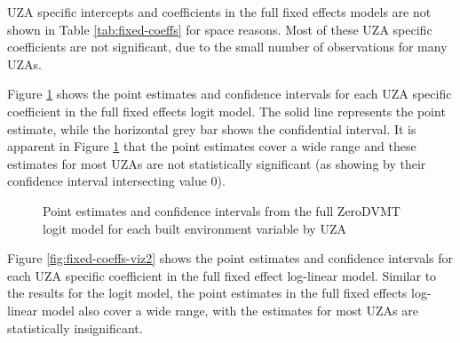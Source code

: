 \documentclass[numbered]{trbunofficial}
\begin{document}
UZA specific intercepts and coefficients in the full fixed effects models are not shown in Table \ref{tab:fixed-coeffs} for space reasons. Most of these UZA specific coefficients are not significant, due to the small number of observations for many UZAs.

Figure \ref{fig:fixed-coeffs-viz1} shows the point estimates and confidence intervals for each UZA specific coefficient in the full fixed effects logit model. The solid line represents the point estimate, while the horizontal grey bar shows the confidential interval. It is apparent in Figure \ref{fig:fixed-coeffs-viz1} that the point estimates cover a wide range and these estimates for most UZAs are not statistically significant (as showing by their confidence interval intersecting value 0).

\begin{figure}

{\centering {}\newline{}\newline{}

}

\caption{Point estimates and confidence intervals from the full ZeroDVMT logit model for each built environment variable by UZA}\label{fig:fixed-coeffs-viz1}
\end{figure}

Figure \ref{fig:fixed-coeffs-viz2} shows the point estimates and confidence intervals for each UZA specific coefficient in the full fixed effect log-linear model. Similar to the results for the logit model, the point estimates in the full fixed effects log-linear model also cover a wide range, with the estimates for most UZAs are statistically insignificant.
\end{document}
